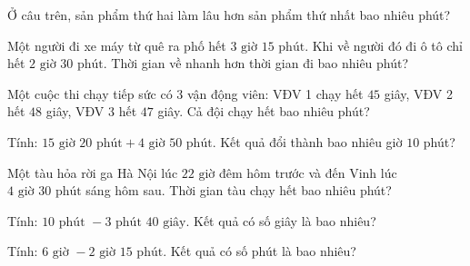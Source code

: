 \begin{ex}
  Ở câu trên, sản phẩm thứ hai làm lâu hơn sản phẩm thứ nhất bao nhiêu phút?
\end{ex}

\begin{ex}
  Một người đi xe máy từ quê ra phố hết $3\text{ giờ } 15\text{ phút}$. Khi về người đó đi ô tô chỉ hết $2\text{ giờ } 30\text{ phút}$. Thời gian về nhanh hơn thời gian đi bao nhiêu phút?
\end{ex}

\begin{ex}
  Một cuộc thi chạy tiếp sức có 3 vận động viên: VĐV 1 chạy hết $45$ giây, VĐV 2 hết $48$ giây, VĐV 3 hết $47$ giây. Cả đội chạy hết bao nhiêu phút?
\end{ex}

\begin{ex}
  Tính: $15\text{ giờ } 20\text{ phút} + 4\text{ giờ } 50\text{ phút}$. Kết quả đổi thành bao nhiêu giờ $10$ phút?
\end{ex}

\begin{ex}
  Một tàu hỏa rời ga Hà Nội lúc $22\text{ giờ}$ đêm hôm trước và đến Vinh lúc $4\text{ giờ } 30\text{ phút}$ sáng hôm sau. Thời gian tàu chạy hết bao nhiêu phút?
\end{ex}

\begin{ex}
  Tính: $10\text{ phút } - 3\text{ phút } 40\text{ giây}$. Kết quả có số giây là bao nhiêu?
\end{ex}

\begin{ex}
  Tính: $6\text{ giờ } - 2\text{ giờ } 15\text{ phút}$. Kết quả có số phút là bao nhiêu?
\end{ex}

